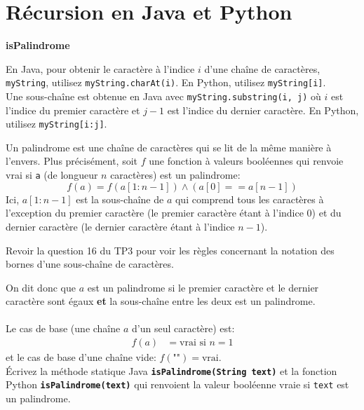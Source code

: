 \section{Récursion en Java et Python}
\begin{Exercice} \textbf{isPalindrome}
    \begin{conseil}
        En Java, pour obtenir le caractère à l'indice $i$ d'une chaîne de caractères, \texttt{myString}, utilisez \texttt{myString.charAt(i)}. En Python, utilisez \texttt{myString[i]}. \\
        
        Une sous-chaîne est obtenue en Java avec \texttt{myString.substring(i, j)} où $i$ est l'indice du premier caractère et $j-1$ est l'indice du dernier caractère. En Python, utilisez \texttt{myString[i:j]}.
    \end{conseil}
      Un palindrome est une chaîne de caractères qui se lit de la même manière à l'envers. Plus précisément, soit $f$ une fonction à valeurs booléennes qui renvoie vrai si \texttt{a} (de longueur $n$ caractères) est un palindrome: \\
\begin{equation}
    f(a) = f(a[1:n-1])\wedge (a[0] == a[n-1])
\end{equation}
Ici, $a[1:n-1]$ est la sous-chaîne de $a$ qui comprend tous les caractères à l'exception du premier caractère (le premier caractère étant à l'indice 0) et du dernier caractère (le dernier caractère étant à l'indice $n-1$). 
\begin{conseil}
    Revoir la question 16 du TP3 pour voir les règles concernant la notation des bornes d'une sous-chaîne de caractères. 
\end{conseil}
On dit donc que $a$ est un palindrome si le premier caractère et le dernier caractère sont égaux \textbf{et} la sous-chaîne entre les deux est un palindrome. \\  \\

Le cas de base (une chaîne $a$ d'un seul caractère) est:
\begin{align*}
    f(a) &= \text{vrai} \text{ si } n=1
\end{align*}
et le cas de base d'une chaîne vide: $f(\texttt{""}) = \text{vrai}$.\\

Écrivez la méthode statique Java \textbf{\texttt{isPalindrome(String text)}} et la fonction Python \newline \textbf{\texttt{isPalindrome(text)}} qui renvoient la valeur booléenne vraie si \texttt{text} est un palindrome.

\begin{solution}[Java]

\end{solution}
\begin{solution}[Python]
    
\end{solution}

\end{Exercice}

